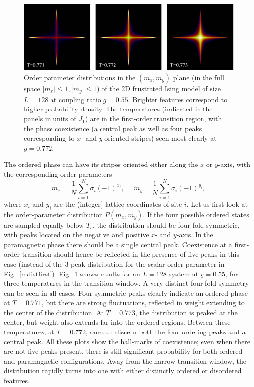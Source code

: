 \documentclass[draft,numberedheadings]{aipproc}
\begin{document}
\begin{figure}
\includegraphics[width=14cm, clip]{j1j2hist2.eps}
\caption{Order parameter distributions in the $(m_x,m_y)$ plane (in the full space $|m_x|\le 1,|m_y|\le 1$) of the 2D frustrated Ising model of size $L=128$ 
at coupling ratio $g=0.55$. Brighter features correspond to higher probability density. The temperatures (indicated in the panels in units of $J_1$) 
are in the first-order transition region, with the phase coexistence (a central peak as well as four peaks corresponding to $x$- and $y$-oriented 
stripes) seen most clearly at $g=0.772$.}
\label{j1j2hist}
\end{figure}

The ordered phase can have its stripes oriented either along the $x$ or $y$-axis, with the corresponding order parameters
\begin{equation}
m_x=\frac{1}{N}\sum_{i=1}^N\sigma_i (-1)^{x_i},~~~~~~m_y=\frac{1}{N}\sum_{i=1}^N\sigma_i (-1)^{y_i},
\end{equation}
where $x_i$ and $y_i$ are the (integer) lattice coordinates of site $i$. Let us first look at the order-parameter distribution 
$P(m_x,m_y)$. If the four possible ordered states are sampled equally below $T_c$, the distribution should be four-fold symmetric, with peaks located 
on the negative and positive $x$- and $y$-axis. In the paramagnetic phase there should be a single central peak. Coexistence at a first-order transition 
should hence be reflected in the presence of five peaks in this case (instead of the 3-peak distribution for the scalar order parameter in 
Fig.~\ref{mdistfirst}). Fig.~\ref{j1j2hist} shows results for an $L=128$ system at $g=0.55$, for three temperatures in the transition window. 
A very distinct four-fold symmetry can be seen in all cases. Four symmetric peaks clearly indicate an ordered phase at $T=0.771$, but there are
strong fluctuations, reflected in weight extending to the center of the distribution. At $T=0.773$, the distribution is peaked at the center, but 
weight also extends far into the ordered regions. Between these temperatures, at $T=0.772$, one can discern both the four ordering peaks and a central 
peak. All these plots show the hall-marks of coexistence; even when there are not five peaks present, there is still significant probability
for both ordered and paramagnetic configurations. Away from the narrow transition window, the distribution rapidly turns into one with either
distinctly ordered or disordered features.
\end{document}
